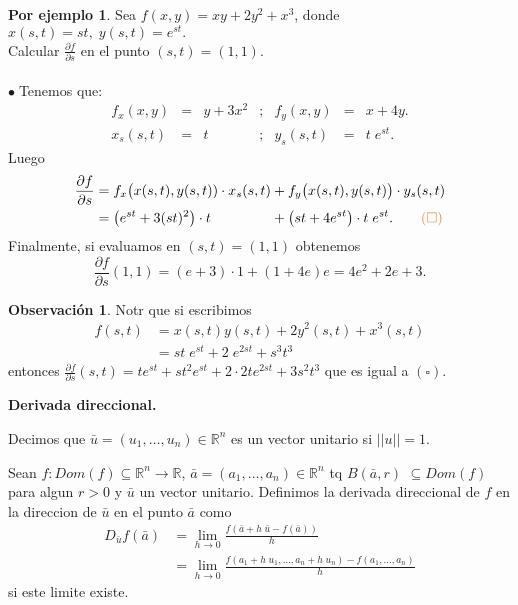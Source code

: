 \documentclass{article}
\theoremstyle{definition}
\theoremstyle{definition}
\newtheorem*{obs}{Observación}
\newtheorem*{ej}{Por ejemplo}
\theoremstyle{remark}
\newcommand\bl{$\bullet\;$}
\begin{document}
\begin{ej}
  Sea $f(x,y)=xy+2y^2+x^3$, donde \mbox{$x(s,t)=st, \; y(s,t)=e^{st}.$} \\Calcular $\frac{\partial f }{\partial s}$ en el punto $(s,t)=(1,1)$. \\\\
  \bl Tenemos que:  $$\begin{array}{lclclcl}
      f_x(x,y) & = & y+3x^2 & ; & f_y(x,y) & = & x+4y. \\
      x_s(s,t) & = & t & ; & y_s(s,t) & = &  t \; e^{st}.
      \end{array}$$ Luego \[
  \begin{alignedat}{10}
  \frac{\partial f}{\partial s} & = f_x \big(x(s,t),y(s,t)) \cdot x_s(s,t) && + f_y \big(x(s,t),y(s,t)\big) \cdot y_s(s,t) \\ 
                                & = \big(e^{st}+3(st)^2\big) \cdot t && + \big(st+4e^{st}\big) \cdot t\; e^{st}. \quad \quad \textcolor{rojop2}{(\square)}\end{alignedat}
      \]Finalmente, si evaluamos en $(s,t)=(1,1)$ obtenemos \[
      \frac{\partial f}{\partial s}(1,1)=(e+3)\cdot 1+(1+4e)e = 4e^2+2e+3.
    \]
                                       \end{ej}
\begin{obs}
  Notr que si escribimos \[ 
    \begin{aligned}
      f(s,t) & = x(s,t)y(s,t)+2y^2(s,t)+x^3(s,t) \\
             & =st \; e^{st} + 2 \; e^{2st} + s^3t^3
    \end{aligned}
  \] entonces $\frac{\partial f }{\partial s}(s,t)=te^{st}+st^2e^{st}+2\cdot2te^{2st}+3s^2t^3$ que es igual a \textcolor{rojop2}{$(\square)$}.
\end{obs}\pagebreak
\begin{center}
\textbf{Derivada direccional.}
\end{center}
\begin{defi}
  Decimos que $\bar{u}=(u_1,\dots,u_n) \in \mathbb{R}^n$ es un vector unitario si $||u||=1$. 
\end{defi}
\begin{defi}
  Sean $f: Dom(f) \subseteq \mathbb{R}^n \to \mathbb{R}$, $\bar{a}=(a_1,\dots,a_n) \in \mathbb{R}^n$ tq $B(\bar{a},r)$ $\subseteq Dom(f)$ para algun $r>0$ y $\bar{u}$ un vector unitario. Definimos la derivada direccional de $f$ en la direccion de $\bar{u}$ en el punto $\bar{a}$ como \[
    \begin{aligned}
      D_{\bar{u}}f(\bar{a}) & = \lim_{h\to0}{\frac{f(\bar{a}+h\;\bar{u}-f(\bar{a}))}{h}} \\
                            & = \lim_{h \to 0}{\frac{f(a_1+h\;u_1,\dots,a_n+h\;u_n)-f(a_1,\dots,a_n)}{h}} 
  \end{aligned}\]si este limite existe.
\end{defi}
\end{document}
